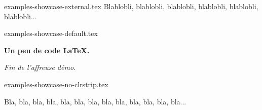 \begin{filecontents*}[overwrite]{examples-showcase-external.tex}
Blablobli, blablobli, blablobli, blablobli, blablobli, blablobli...
\end{filecontents*}


\begin{filecontents*}[overwrite]{examples-showcase-default.tex}
\begin{tdocshowcase}
    \bfseries Un peu de code \LaTeX.

    \bigskip

    \emph{\large Fin de l'affreuse démo.}
\end{tdocshowcase}
\end{filecontents*}


\begin{filecontents*}[overwrite]{examples-showcase-no-clrstrip.tex}
\begin{tdocshowcase}[nostripe]
    Bla, bla, bla, bla, bla, bla, bla, bla, bla, bla, bla, bla, bla...
\end{tdocshowcase}
\end{filecontents*}



\documentclass{tutodoc}

\usepackage[utf8]{inputenc}
\usepackage[T1]{fontenc}

\usepackage{enumitem}

\usepackage[french]{babel, varioref}

\usepackage{multicol}

\usepackage{pdfpages}

\newcommand\thisproj{\tdoccls{tutodoc}}
\newcommand\thisrepo{\url{https://github.com/bc-tools/for-latex/tree/tutodoc}}
\newcommand\thismonorepo{\url{https://github.com/bc-tools/for-latex}}


\newcommand\ctan{\href{https://ctan.org/}{\trademark{CTAN}}}
\newcommand\git{\trademark{git}}
\newcommand\pdf{\trademark{PDF}}






